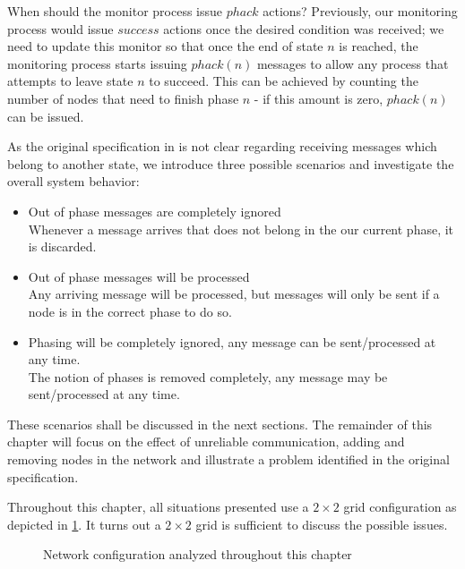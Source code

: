 When should the monitor process issue $phack$ actions? Previously, our monitoring process would issue $success$ actions once the desired condition was received; we need to update this monitor so that once the end of state $n$ is reached, the monitoring process starts issuing $phack(n)$ messages to allow any process that attempts to leave state $n$ to succeed. This can be achieved by counting the number of nodes that need to finish phase $n$ - if this amount is zero, $phack(n)$ can be issued.

As the original specification in \cite{hendriksen08sp} is not clear regarding receiving messages which belong to another state, we introduce three possible scenarios and investigate the overall system behavior:

\begin{itemize}
\item Out of phase messages are completely ignored \\
Whenever a message arrives that does not belong in the our current phase, it is discarded.
\item Out of phase messages will be processed \\
Any arriving message will be processed, but messages will only be sent if a node is in the correct phase to do so.
\item Phasing will be completely ignored, any message can be sent/processed at any time. \\
The notion of phases is removed completely, any message may be sent/processed at any time.
\end{itemize}

These scenarios shall be discussed in the next sections. The remainder of this chapter will focus on the effect of unreliable communication, adding and removing nodes in the network and illustrate a problem identified in the original specification.

Throughout this chapter, all situations presented use a $2 \times 2$ grid configuration as depicted in \ref{fig:nodesformsc1}. It turns out a $2 \times 2$ grid is sufficient to discuss the possible issues.

\begin{figure}[h]
\centering
\begin{nodefigure}
\end{nodefigure}
\caption{\label{fig:nodesformsc1} Network configuration analyzed throughout this chapter}
\end{figure}

